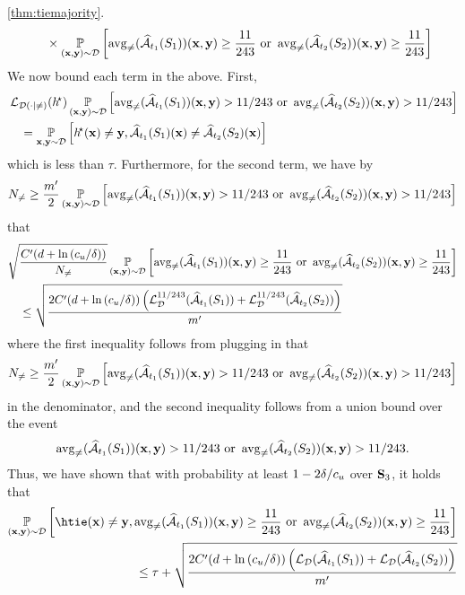 \begin{proofof}{\cref{thm:tiemajority}.}
\begin{align*}
& \qquad \times \operatorname*{\mathbb{P}}_{(\mathbf{x},\mathbf{y})\sim\mathcal{D}}\left[\operatorname{\mathrm{avg}_{\not=}}(\widehat{\mathcal{A}}_{t_{1}}(S_{1}))(\mathbf{x},\mathbf{y})\geq \frac{11}{243} \text{ or } \operatorname{\mathrm{avg}_{\not=}}(\widehat{\mathcal{A}}_{t_{2}}(S_{2}))(\mathbf{x},\mathbf{y})\geq \frac{11}{243}\right]
\end{align*}
We now bound each term in the above. 
First, 
\begin{align*}
& \operatorname{\mathcal{L}}_{\mathcal{D}(\cdot|\not=)}(h^{\negmedspace\star})  \operatorname*{\mathbb{P}}_{(\mathbf{x},\mathbf{y})\sim\mathcal{D}}\left[\operatorname{\mathrm{avg}_{\not=}}(\widehat{\mathcal{A}}_{t_{1}}(S_{1}))(\mathbf{x},\mathbf{y})> 11/243 \text{ or } \operatorname{\mathrm{avg}_{\not=}}(\widehat{\mathcal{A}}_{t_{2}}(S_{2}))(\mathbf{x},\mathbf{y})> 11/243\right] \\
& \quad =\operatorname*{\mathbb{P}}_{\mathbf{x},\mathbf{y}\sim\mathcal{D}}\left[h^{\negmedspace\star}(\mathbf{x})\not=\mathbf{y},\widehat{\mathcal{A}}_{t_{1}}(S_{1})(\mathbf{x})\not=\widehat{\mathcal{A}}_{t_{2}}(S_{2})(\mathbf{x})\right] 
\end{align*}
which is less than $ \tau.$ 
Furthermore, for the second term, we have by 
\[ N_{\not=}\geq \frac{m'}{2}\operatorname*{\mathbb{P}}_{(\mathbf{x},\mathbf{y})\sim\mathcal{D}}\left[\operatorname{\mathrm{avg}_{\not=}}(\widehat{\mathcal{A}}_{t_{1}}(S_{1}))(\mathbf{x},\mathbf{y})> 11/243 \text{ or } \operatorname{\mathrm{avg}_{\not=}}(\widehat{\mathcal{A}}_{t_{2}}(S_{2}))(\mathbf{x},\mathbf{y})> 11/243\right] \] 
that 
\begin{align*}
& \sqrt{\frac{C'(d+\ln{\left(c_{u}/\delta \right)})}{N_{\not=}}}\operatorname*{\mathbb{P}}_{(\mathbf{x},\mathbf{y})\sim\mathcal{D}}\left[\operatorname{\mathrm{avg}_{\not=}}(\widehat{\mathcal{A}}_{t_{1}}(S_{1}))(\mathbf{x},\mathbf{y})\geq \frac{11}{243} \text{ or } \operatorname{\mathrm{avg}_{\not=}}(\widehat{\mathcal{A}}_{t_{2}}(S_{2}))(\mathbf{x},\mathbf{y})\geq \frac{11}{243}\right]
    \\
& \quad \leq \sqrt{\frac{2C'(d+\ln{\left(c_{u}/\delta \right)})\left(\operatorname{\mathcal{L}}_{\mathcal{D}}^{11/243}(\widehat{\mathcal{A}}_{t_{1}}(S_{1})) +\operatorname{\mathcal{L}}_{\mathcal{D}}^{11/243}(\widehat{\mathcal{A}}_{t_{2}}(S_{2}))\right)}{m'}}
    \end{align*}    
where the first inequality follows from plugging in that 
\[ N_{\not=}\geq \frac{m'}{2} \operatorname*{\mathbb{P}}_{(\mathbf{x},\mathbf{y})\sim\mathcal{D}}\left[\operatorname{\mathrm{avg}_{\not=}}(\widehat{\mathcal{A}}_{t_{1}}(S_{1}))(\mathbf{x},\mathbf{y})> 11/243 \text{ or } \operatorname{\mathrm{avg}_{\not=}}(\widehat{\mathcal{A}}_{t_{2}}(S_{2}))(\mathbf{x},\mathbf{y})> 11/243\right] \]  in the denominator, and the second inequality follows from a union bound over the event 
\[ \operatorname{\mathrm{avg}_{\not=}}(\widehat{\mathcal{A}}_{t_{1}}(S_{1}))(\mathbf{x},\mathbf{y})> 11/243 \text{ or } \operatorname{\mathrm{avg}_{\not=}}(\widehat{\mathcal{A}}_{t_{2}}(S_{2}))(\mathbf{x},\mathbf{y})> 11/243 .\]  
Thus, we have shown that with probability at least $ 1-2\delta/c_{u} $ over $\mathbf{S}_{3}$, it holds that 
\begin{align*}
    \p_{(\rx,\ry)\sim\cD}\left[ \htie(\rx)\not=\ry,\avg(\widehat{\cA}_{t_{1}}(S_{1}))(\rx,\ry)\geq \frac{11}{243} \text{ or } \avg(\widehat{\cA}_{t_{2}}(S_{2}))(\rx,\ry)\geq \frac{11}{243}\right]
    \\
    \leq \tau+ \sqrt{\frac{2C'(d+\ln{\left(\cu/\delta \right)})\left(\ls_{\cD}(\widehat{\cA}_{t_{1}}(S_{1})) +\ls_{\cD}(\widehat{\cA}_{t_{2}}(S_{2}))\right)}{m'}}

\end{align*}
\end{proofof}
